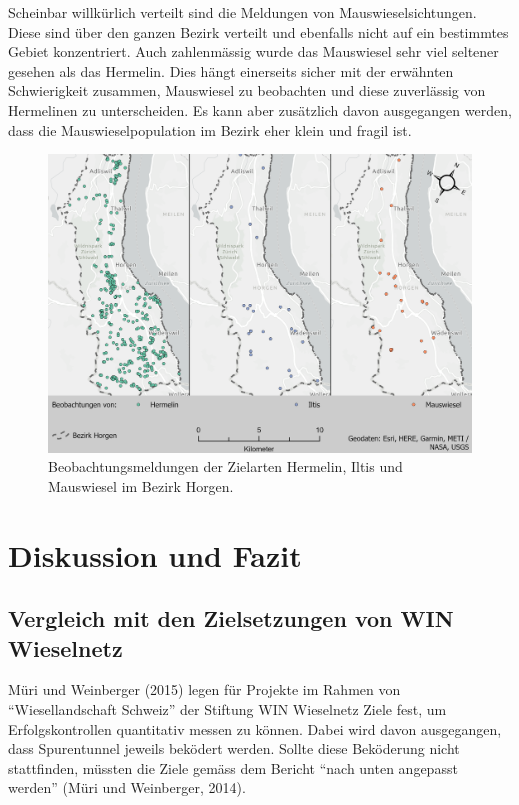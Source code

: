 \documentclass[
  oneside]{scrbook}
\begin{document}
Scheinbar willkürlich verteilt sind die Meldungen von Mauswieselsichtungen. Diese sind über den ganzen Bezirk verteilt und ebenfalls nicht auf ein bestimmtes Gebiet konzentriert. Auch zahlenmässig wurde das Mauswiesel sehr viel seltener gesehen als das Hermelin. Dies hängt einerseits sicher mit der erwähnten Schwierigkeit zusammen, Mauswiesel zu beobachten und diese zuverlässig von Hermelinen zu unterscheiden. Es kann aber zusätzlich davon ausgegangen werden, dass die Mauswieselpopulation im Bezirk eher klein und fragil ist.



\begin{figure}
\includegraphics[width=1\linewidth]{images/Layout_Beobachtungsmeldungen} \caption{Beobachtungsmeldungen der Zielarten Hermelin, Iltis und Mauswiesel im Bezirk Horgen.}\label{fig:layoutbeobachtungsmeldungen}
\end{figure}

\hypertarget{diskussion-und-fazit}{%
\chapter{Diskussion und Fazit}\label{diskussion-und-fazit}}

\hypertarget{vergleich-mit-den-zielsetzungen-von-win-wieselnetz}{%
\section{Vergleich mit den Zielsetzungen von WIN Wieselnetz}\label{vergleich-mit-den-zielsetzungen-von-win-wieselnetz}}

Müri und Weinberger (2015) legen für Projekte im Rahmen von ``Wiesellandschaft Schweiz'' der Stiftung WIN Wieselnetz Ziele fest, um Erfolgskontrollen quantitativ messen zu können. Dabei wird davon ausgegangen, dass Spurentunnel jeweils beködert werden. Sollte diese Beköderung nicht stattfinden, müssten die Ziele gemäss dem Bericht ``nach unten angepasst werden'' (Müri und Weinberger, 2014).
\end{document}
